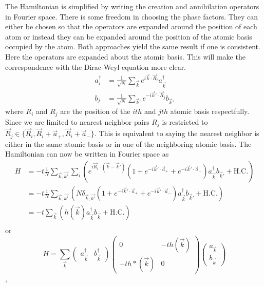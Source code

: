 The Hamiltonian is simplified by writing the creation and annihilation operators in Fourier space.
There is some freedom in choosing the phase factors.
They can either be chosen so that the operators are expanded around the position of each atom or instead they can be expanded around the position of the atomic basis occupied by the atom.
Both approaches yield the same result if one is consistent\cite{Bena2009}.
Here the operators are expanded about the atomic basis.
This will make the correspondence with the Dirac-Weyl equation more clear.
\begin{align}
	a_i^{\dagger}&=\frac{1}{\sqrt{N}}\sum_{\vec{k} } e^{ i \vec{k}  \cdot \vec{R}_i} a_{\vec{k} }^{\dagger} \nonumber \\
	b_j          &=\frac{1}{\sqrt{N}}\sum_{\vec{k}'} e^{-i \vec{k}' \cdot \vec{R}_j} b_{\vec{k}'} \label{eq:TB:FT} 
\end{align}
where $R_i$ and $R_j$ are the position of the $ith$ and $jth$ atomic basis respectfully.  
Since we are limited to nearest neighbor pairs $R_j$ is restricted to $\vec{R}_j \in \{ \vec{R}_i,\vec{R}_i+\vec{a}_+,\vec{R}_i+\vec{a}_-\}$.
This is equivalent to saying the nearest neighbor is either in the same atomic basis or in one of the neighboring atomic basis. 
The Hamiltonian can now be written in Fourier space as
\begin{align}
	H&=-t \frac{1}{N} \sum_{\vec{k},\vec{k'}}\sum_i \left( e^{i \vec{R}_i \cdot (\vec{k}-\vec{k}')}
		\left( 1+e^{-i \vec{k}' \cdot \vec{a}_+}+e^{-i \vec{k}' \cdot \vec{a}_-} \right) 
		a^{\dagger}_{\vec{k}} b_{\vec{k}'} + \text{H.C.} \right)\\
	 &=-t \frac{1}{N} \sum_{\vec{k},\vec{k'}}\left( N \delta_{\vec{k},\vec{k'}}
	 	\left( 1+e^{-i \vec{k}' \cdot \vec{a}_+}+e^{-i \vec{k}' \cdot \vec{a}_-}\right) 
		a^{\dagger}_{\vec{k}} b_{\vec{k}'} + \text{H.C.}\right)\\ 
	 &=-t \sum_{\vec{k}}\left( h(\vec{k})a^{\dagger}_{\vec{k}} b_{\vec{k}} + \text{H.C.} \right)\\ 
\end{align}
or
\begin{equation}
	H=\sum_{\vec k} 
		\left( \begin{array}{cc} a^{\dagger}_{\vec{k}} & b^{\dagger}_{\vec{k}} \end{array} \right)
		\left( \begin{array}{cc}
			0              & -t h(\vec{k}) \\
			-t h*(\vec{k}) & 0                                                 \end{array} \right)
		\left( \begin{array}{c } a_{\vec{k}}           \\ b_{\vec{k}}          \end{array} \right) 
	\label{eq:TB:RealSpace}
\end{equation},
